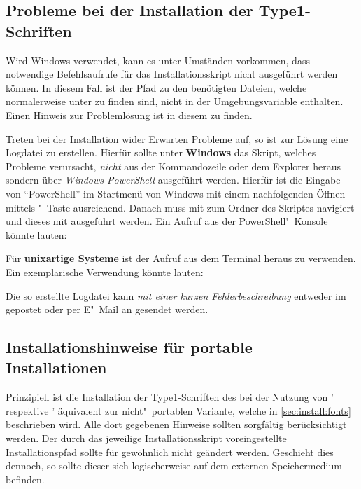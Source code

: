 \subsection{Probleme bei der Installation der Type1-Schriften}
%
Wird Windows verwendet, kann es unter Umständen vorkommen, dass notwendige 
Befehlsaufrufe für das Installationsskript nicht ausgeführt werden können. In 
diesem Fall ist der Pfad zu den benötigten Dateien, welche normalerweise unter 
 zu finden sind, nicht in der 
Umgebungsvariable  enthalten. Einen Hinweis zur Problemlösung ist 
in diesem  zu finden.

Treten bei der Installation wider Erwarten Probleme auf, so ist zur Lösung eine 
Logdatei zu erstellen. Hierfür sollte unter \textbf{Windows} das Skript, 
welches Probleme verursacht, \emph{nicht} aus der Kommandozeile oder dem 
Explorer heraus sondern über \emph{Windows PowerShell} ausgeführt werden. 
Hierfür ist die Eingabe von \enquote{PowerShell} im Startmenü von Windows mit 
einem nachfolgenden Öffnen mittels "~Taste ausreichend. 
Danach muss mit  zum Ordner des Skriptes navigiert und dieses mit 
ausgeführt werden. Ein Aufruf aus der PowerShell"~Konsole könnte lauten:
%
\begin{quoting}[rightmargin=0pt]
\newline%
%
\end{quoting}
%
Für \textbf{unixartige Systeme} ist der Aufruf 
 aus dem Terminal heraus zu 
verwenden. Ein exemplarische Verwendung könnte lauten:
%
\begin{quoting}
\newline
{}%
\end{quoting}
%
Die so erstellte Logdatei kann \emph{mit einer kurzen Fehlerbeschreibung} 
entweder im \Forum gepostet oder per E"~Mail an \mailto{\TUDScriptContact}
gesendet werden.


\subsection{%
  Installationshinweise für portable Installationen%
  \label{sec:install:portable}%
}
%
Prinzipiell ist die Installation der Type1-Schriften des \CDs bei der Nutzung 
von \TeXLive' respektive \MiKTeX' äquivalent zur nicht"~portablen Variante, 
welche in \autoref{sec:install:fonts} beschrieben wird. Alle dort gegebenen 
Hinweise sollten sorgfältig berücksichtigt werden. Der durch das jeweilige 
Installationsskript voreingestellte Installationspfad sollte für gewöhnlich 
nicht geändert werden. Geschieht dies dennoch, so sollte dieser sich 
logischerweise auf dem externen Speichermedium 
 befinden.

